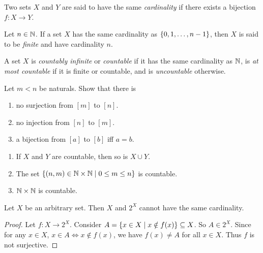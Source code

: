 \begin{definition}
    Two sets $X$ and $Y$ are said to have the same \emph{cardinality} if
    there exists a bijection $f\colon X \to Y$.

    Let $n \in \mathbb{N}$.
    If a set $X$ has the same cardinality as $\set{0, 1, \ldots, n - 1}$,
    then $X$ is said to be \emph{finite} and have cardinality $n$.
\end{definition}

\begin{definition*}
    A set $X$ is \emph{countably infinite} or \emph{countable} if it has the
    same cardinality as $\mathbb{N}$, is \emph{at most countable} if it is finite or
    countable, and is \emph{uncountable} otherwise.
\end{definition*}
\begin{exercise*}
    Let $m < n$ be naturals.
    Show that there is
    \begin{enumerate}
        \item no surjection from $[m]$ to $[n]$\footnotemark.
        \item no injection from $[n]$ to $[m]$.
        \item a bijection from $[a]$ to $[b]$ iff $a = b$.
    \end{enumerate}
\end{exercise*}

\begin{exercise*} \leavevmode
    \begin{enumerate}
        \item If $X$ and $Y$ are countable, then so is $X \cup Y$.
        \item The set $\set{(n, m) \in \N \times \N \mid 0 \le m \le n}$ is
            countable.
        \item $\mathbb{N} \times \mathbb{N}$ is countable.
    \end{enumerate}
\end{exercise*}
\begin{theorem*}
    Let $X$ be an arbitrary set.
    Then $X$ and $2^X$ cannot have the same cardinality.
\end{theorem*}
\begin{proof}
    Let $f\colon X \to 2^X$.
    Consider $A = \set{x \in X \mid x \notin f(x)} \subseteq X$.
    So $A \in 2^X$.
    Since for any $x \in X$, $x \in A \iff x \notin f(x)$, we have
    $f(x) \ne A$ for all $x \in X$.
    Thus $f$ is not surjective.
\end{proof}
